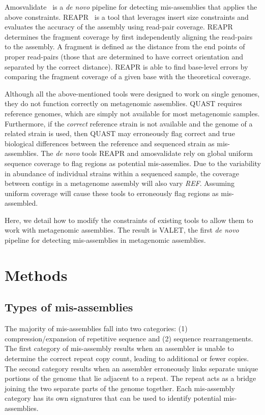 \documentclass{bioinfo}
\begin{document}
Amosvalidate~\citep{amosvalidate2008} is a \emph{de novo} pipeline for detecting mis-assemblies that applies the above constraints. REAPR~\citep{hunt2013reapr} is a tool that leverages insert size constraints and evaluates the accuracy of the assembly using read-pair coverage.
REAPR determines the fragment coverage by first independently aligning the read-pairs to the assembly.
A fragment is defined as the distance from the end points of proper read-pairs (those that are determined to have correct orientation and separated by the correct distance).
REAPR is able to find base-level errors by comparing the fragment coverage of a given base with the theoretical coverage.

Although all the above-mentioned tools were designed to work on single genomes, they do not function correctly on metagenomic assemblies.
QUAST requires reference genomes, which are simply not available for most metagenomic samples.
Furthermore, if the \emph{correct} reference strain is not available and the genome of a related strain is used, then QUAST may erroneously flag correct and true biological differences between the reference and sequenced strain as mis-assemblies.
The \emph{de novo} tools REAPR and amosvalidate rely on global uniform sequence coverage to flag regions as potential mis-assemlies.
Due to the variability in abundance of individual strains within a sequenced sample, the coverage between contigs in a metagenome assembly will also vary \emph{REF}.
Assuming uniform coverage will cause these tools to erroneously flag regions as mis-assembled.

Here, we detail how to modify the constraints of existing tools to allow them to work with metagenomic assemblies.
The result is VALET, the first \emph{de novo} pipeline for detecting mis-assemblies in metagenomic assemblies.

\section{Methods}

\subsection{Types of mis-assemblies}

The majority of mis-assemblies fall into two categories: (1) compression/expansion of repetitive sequence and (2) sequence rearrangements.
The first category of mis-assembly results when an assembler is unable to determine the correct repeat copy count, leading to additional or fewer copies.
The second category results when an assembler erroneously links separate unique portions of the genome that lie adjacent to a repeat.
The repeat acts as a bridge joining the two separate parts of the genome together.
Each mis-assembly category has its own signatures that can be used to identify potential mis-assemblies.
\end{document}
